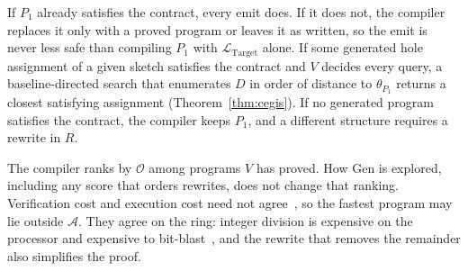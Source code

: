 If \(P_1\) already satisfies the contract, every emit does. If it does not,
the compiler replaces it only with a proved program or leaves it as written,
so the emit is never less safe than compiling \(P_1\) with
\(\mathcal{L}_{\text{Target}}\) alone. If some generated hole assignment of
a given sketch satisfies the contract and \(V\) decides every query, a
baseline-directed search that enumerates \(D\) in order of distance to
\(\theta_{P_1}\) returns a closest satisfying assignment
(Theorem~\ref{thm:cegis}). If no generated program satisfies the contract,
the compiler keeps \(P_1\), and a different structure requires a rewrite in
\(R\).

The compiler ranks by \(\mathcal{O}\) among programs \(V\) has proved.
How \(\mathrm{Gen}\) is explored, including any score that orders rewrites,
does not change that ranking. Verification cost and execution cost need not
agree~\cite{wagner2013overify,rinard2026quantitative}, so the fastest program
may lie outside \(\mathcal{A}\). They agree on the ring: integer division is
expensive on the processor and expensive to
bit-blast~\cite{niemetz2024bitblasting}, and the rewrite that removes the
remainder also simplifies the proof.
